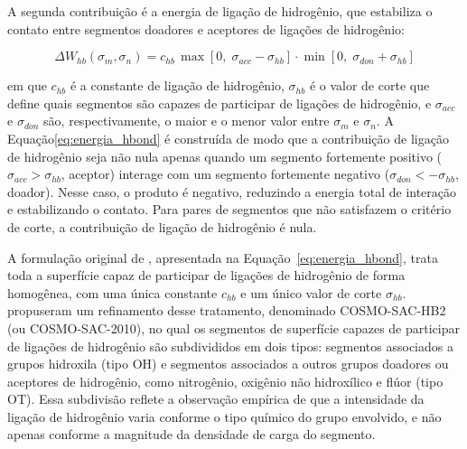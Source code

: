 A segunda contribuição é a energia de ligação de hidrogênio, que estabiliza o contato entre segmentos doadores e aceptores de ligações de hidrogênio\cite{lin2002}:

\begin{equation}
    \Delta W_{hb}(\sigma_m, \sigma_n) =
    c_{hb} \,
    \max\!\left[0, \;\sigma_{acc} - \sigma_{hb}\right]
    \cdot
    \min\!\left[0, \;\sigma_{don} + \sigma_{hb}\right]
    \label{eq:energia_hbond}
\end{equation}

\noindent em que $c_{hb}$ é a constante de ligação de hidrogênio, $\sigma_{hb}$ é o valor de corte que define quais segmentos são capazes de participar de ligações de hidrogênio, e $\sigma_{acc}$ e $\sigma_{don}$ são, respectivamente, o maior e o menor valor entre $\sigma_m$ e $\sigma_n$. A Equação\ref{eq:energia_hbond} é construída de modo que a contribuição de ligação de hidrogênio seja não nula apenas quando um segmento fortemente positivo ($\sigma_{acc} > \sigma_{hb}$, aceptor) interage com um segmento fortemente negativo ($\sigma_{don} < -\sigma_{hb}$, doador). Nesse caso, o produto é negativo, reduzindo a energia total de interação e estabilizando o contato\cite{lin2002}. Para pares de segmentos que não satisfazem o critério de corte, a contribuição de ligação de hidrogênio é nula.


A formulação original de , apresentada na Equação~\ref{eq:energia_hbond}, trata toda a superfície capaz de participar de ligações de hidrogênio de forma homogênea, com uma única constante $c_{hb}$ e um único valor de corte $\sigma_{hb}$.  propuseram um refinamento desse tratamento, denominado COSMO-SAC-HB2 (ou COSMO-SAC-2010), no qual os segmentos de superfície capazes de participar de ligações de hidrogênio são subdivididos em dois tipos: segmentos associados a grupos hidroxila (tipo OH) e segmentos associados a outros grupos doadores ou aceptores de hidrogênio, como nitrogênio, oxigênio não hidroxílico e flúor (tipo OT). Essa subdivisão reflete a observação empírica de que a intensidade da ligação de hidrogênio varia conforme o tipo químico do grupo envolvido, e não apenas conforme a magnitude da densidade de carga do segmento.

